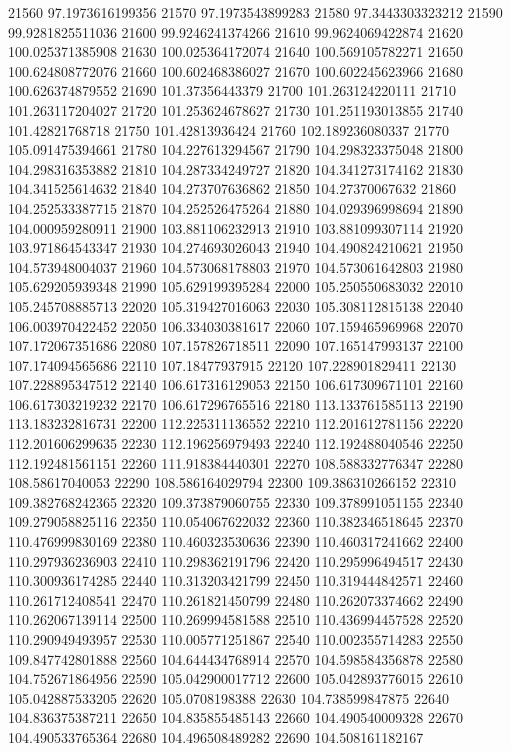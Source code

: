 {21560 97.1973616199356
21570 97.1973543899283
21580 97.3443303323212
21590 99.9281825511036
21600 99.9246241374266
21610 99.9624069422874
21620 100.025371385908
21630 100.025364172074
21640 100.569105782271
21650 100.624808772076
21660 100.602468386027
21670 100.602245623966
21680 100.626374879552
21690 101.37356443379
21700 101.263124220111
21710 101.263117204027
21720 101.253624678627
21730 101.251193013855
21740 101.42821768718
21750 101.42813936424
21760 102.189236080337
21770 105.091475394661
21780 104.227613294567
21790 104.298323375048
21800 104.298316353882
21810 104.287334249727
21820 104.341273174162
21830 104.341525614632
21840 104.273707636862
21850 104.27370067632
21860 104.252533387715
21870 104.252526475264
21880 104.029396998694
21890 104.000959280911
21900 103.881106232913
21910 103.881099307114
21920 103.971864543347
21930 104.274693026043
21940 104.490824210621
21950 104.573948004037
21960 104.573068178803
21970 104.573061642803
21980 105.629205939348
21990 105.629199395284
22000 105.250550683032
22010 105.245708885713
22020 105.319427016063
22030 105.308112815138
22040 106.003970422452
22050 106.334030381617
22060 107.159465969968
22070 107.172067351686
22080 107.157826718511
22090 107.165147993137
22100 107.174094565686
22110 107.18477937915
22120 107.228901829411
22130 107.228895347512
22140 106.617316129053
22150 106.617309671101
22160 106.617303219232
22170 106.617296765516
22180 113.133761585113
22190 113.183232816731
22200 112.225311136552
22210 112.201612781156
22220 112.201606299635
22230 112.196256979493
22240 112.192488040546
22250 112.192481561151
22260 111.918384440301
22270 108.588332776347
22280 108.58617040053
22290 108.586164029794
22300 109.386310266152
22310 109.382768242365
22320 109.373879060755
22330 109.378991051155
22340 109.279058825116
22350 110.054067622032
22360 110.382346518645
22370 110.476999830169
22380 110.460323530636
22390 110.460317241662
22400 110.297936236903
22410 110.298362191796
22420 110.295996494517
22430 110.300936174285
22440 110.313203421799
22450 110.319444842571
22460 110.261712408541
22470 110.261821450799
22480 110.262073374662
22490 110.262067139114
22500 110.269994581588
22510 110.436994457528
22520 110.290949493957
22530 110.005771251867
22540 110.002355714283
22550 109.847742801888
22560 104.644434768914
22570 104.598584356878
22580 104.752671864956
22590 105.042900017712
22600 105.042893776015
22610 105.042887533205
22620 105.0708198388
22630 104.738599847875
22640 104.836375387211
22650 104.835855485143
22660 104.490540009328
22670 104.490533765364
22680 104.496508489282
22690 104.508161182167
}
